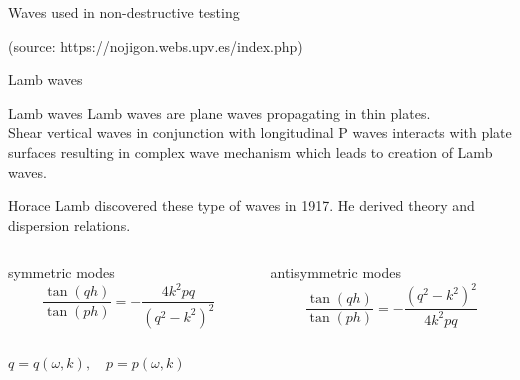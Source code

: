 \documentclass[10pt,aspectratio=169]{beamer} %
\begin{document}
\note{
	
}
\begin{frame}{Waves used in non-destructive testing}
	\begin{figure}			
		\centering
		\qquad			
	\end{figure}			
\tiny 
(source: https://nojigon.webs.upv.es/index.php)
\end{frame}
\note{
	
}
\begin{frame}{Lamb waves}
	\begin{alertblock}{Lamb waves}	
		Lamb waves are plane waves propagating in thin plates.\\
		Shear vertical waves in conjunction with longitudinal P waves interacts with plate surfaces resulting in complex wave mechanism which leads to creation of Lamb waves.
	\end{alertblock}
	Horace Lamb discovered these type of waves in 1917.
	He derived theory and dispersion relations.
	\begin{columns}[T]
		\begin{column}{0.5\textwidth}
			\centering
			symmetric modes
			\begin{equation*}
				\frac{\tan(q h)}{\tan(p h)} = -\frac{4 k^2 p q}{\left(q^2 - k^2\right)^2}
			\end{equation*}
		\end{column}
		\begin{column}{0.5\textwidth}
			\centering
			antisymmetric modes
			\begin{equation*}
				\frac{\tan(q h)}{\tan(p h)} = -\frac{\left(q^2 - k^2\right)^2}{4 k^2 p q}
			\end{equation*}
		\end{column}	
	\end{columns}
	
	\centering
	\(q=q(\omega,k), \quad p=p(\omega,k) \)
\end{frame}
\end{document}
